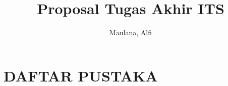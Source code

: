 \documentclass[11pt]{article}
\title{Proposal Tugas Akhir ITS}
\author{Maulana, Alfi}
\begin{document}

  
  \newpage

  

  

  

  

  \section{DAFTAR PUSTAKA}
  \renewcommand\refname{}
  \vspace{-2ex}
  
  
\end{document}
